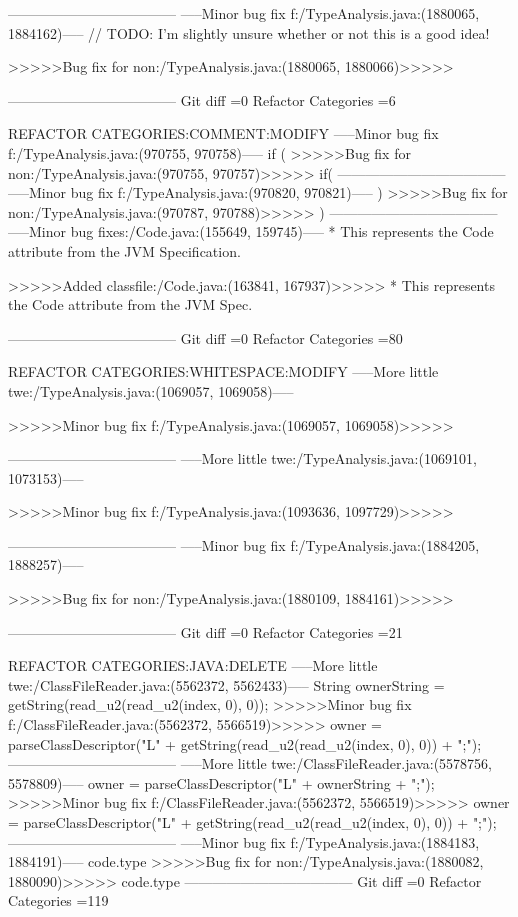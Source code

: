 	
------------------------------------
-----Minor bug fix f:/TypeAnalysis.java:(1880065, 1884162)-----
		// TODO: I'm slightly unsure whether or not this is a good idea!
		
>>>>>Bug fix for non:/TypeAnalysis.java:(1880065, 1880066)>>>>>
		
------------------------------------
Git diff =0  Refactor Categories =6

REFACTOR CATEGORIES:COMMENT:MODIFY
-----Minor bug fix f:/TypeAnalysis.java:(970755, 970758)-----
if (
>>>>>Bug fix for non:/TypeAnalysis.java:(970755, 970757)>>>>>
if(
------------------------------------
-----Minor bug fix f:/TypeAnalysis.java:(970820, 970821)-----
) 
>>>>>Bug fix for non:/TypeAnalysis.java:(970787, 970788)>>>>>
) 
------------------------------------
-----Minor bug fixes:/Code.java:(155649, 159745)-----
 * This represents the Code attribute from the JVM Specification.
 
>>>>>Added classfile:/Code.java:(163841, 167937)>>>>>
 * This represents the Code attribute from the JVM Spec.
 
------------------------------------
Git diff =0  Refactor Categories =80

REFACTOR CATEGORIES:WHITESPACE:MODIFY
-----More little twe:/TypeAnalysis.java:(1069057, 1069058)-----
		
>>>>>Minor bug fix f:/TypeAnalysis.java:(1069057, 1069058)>>>>>
		
------------------------------------
-----More little twe:/TypeAnalysis.java:(1069101, 1073153)-----
		
	
>>>>>Minor bug fix f:/TypeAnalysis.java:(1093636, 1097729)>>>>>

	
------------------------------------
-----Minor bug fix f:/TypeAnalysis.java:(1884205, 1888257)-----

	
>>>>>Bug fix for non:/TypeAnalysis.java:(1880109, 1884161)>>>>>

	
------------------------------------
Git diff =0  Refactor Categories =21

REFACTOR CATEGORIES:JAVA:DELETE
-----More little twe:/ClassFileReader.java:(5562372, 5562433)-----
String ownerString = getString(read_u2(read_u2(index, 0), 0));
>>>>>Minor bug fix f:/ClassFileReader.java:(5562372, 5566519)>>>>>
owner = parseClassDescriptor("L"
					+ getString(read_u2(read_u2(index, 0), 0)) + ";");
------------------------------------
-----More little twe:/ClassFileReader.java:(5578756, 5578809)-----
owner = parseClassDescriptor("L" + ownerString + ";");
>>>>>Minor bug fix f:/ClassFileReader.java:(5562372, 5566519)>>>>>
owner = parseClassDescriptor("L"
					+ getString(read_u2(read_u2(index, 0), 0)) + ";");
------------------------------------
-----Minor bug fix f:/TypeAnalysis.java:(1884183, 1884191)-----
code.type
>>>>>Bug fix for non:/TypeAnalysis.java:(1880082, 1880090)>>>>>
code.type
------------------------------------
Git diff =0  Refactor Categories =119

